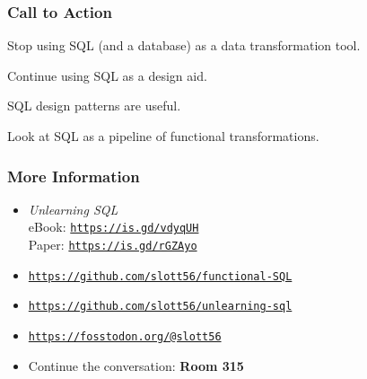 \documentclass{beamer}
\begin{document}
\begin{frame}
    \frametitle{Call to Action}
    Stop using SQL (and a database) as a data transformation tool.

    \vspace{1em}
    Continue using SQL as a design aid.

    \vspace{1em}
    SQL design patterns are useful.

    \vspace{1em}
    Look at SQL as a pipeline of functional transformations.
\end{frame}

\begin{frame}
    \frametitle{More Information}

    \begin{itemize}
        \item \textit{Unlearning SQL} \\ eBook: \texttt{\underline{https://is.gd/vdyqUH}} \\ Paper: \texttt{\underline{https://is.gd/rGZAyo}} \vspace{1em}
        \item \texttt{\underline{https://github.com/slott56/functional-SQL}}
        \item \texttt{\underline{https://github.com/slott56/unlearning-sql}}
        \item \texttt{\underline{https://fosstodon.org/@slott56}}  \vspace{1em}
        \item Continue the conversation: \textbf{Room 315}
    \end{itemize}


    \begin{center}
    \end{center}

\end{frame}
\end{document}
